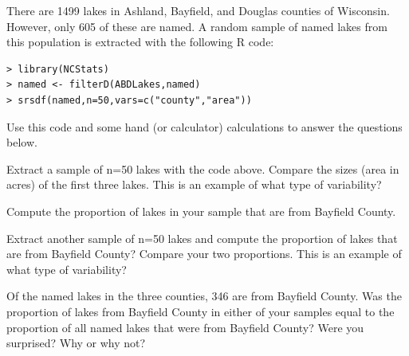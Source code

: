 \documentclass[10pt,openany]{book}\usepackage[]{graphicx}\usepackage[]{color}
\makeatletter
\newenvironment{kframe}{%
 \def\at@end@of@kframe{}%
 \ifinner\ifhmode%
  \def\at@end@of@kframe{\end{minipage}}%
  \begin{minipage}{\columnwidth}%
 \fi\fi%
 \def\FrameCommand##1{\hskip\@totalleftmargin \hskip-\fboxsep
 \colorbox{shadecolor}{##1}\hskip-\fboxsep
     \hskip-\linewidth \hskip-\@totalleftmargin \hskip\columnwidth}%
 \MakeFramed {\advance\hsize-\width
   \@totalleftmargin\z@ \linewidth\hsize
   \@setminipage}}%
 {\par\unskip\endMakeFramed%
 \at@end@of@kframe}
\newenvironment{knitrout}{}{} %
\makeatother
\begin{document}
\newpage
\begin{exsection}
  \item \label{revex:WhyStatsLakes} There are 1499 lakes in Ashland, Bayfield, and Douglas counties of Wisconsin.  However, only 605 of these are named.  A random sample of named lakes from this population is extracted with the following R code:
\vspace{-12pt}
\begin{knitrout}
\color{fgcolor}\begin{kframe}
\begin{verbatim}
> library(NCStats)
> named <- filterD(ABDLakes,named)
> srsdf(named,n=50,vars=c("county","area"))
\end{verbatim}
\end{kframe}
\end{knitrout}
Use this code and some hand (or calculator) calculations to answer the questions below. 
    \begin{Enumerate}
      \item Extract a sample of n=50 lakes with the code above.  Compare the sizes (area in acres) of the first three lakes.  This is an example of what type of variability?
      \item Compute the proportion of lakes in your sample that are from Bayfield County.
      \item Extract another sample of n=50 lakes and compute the proportion of lakes that are from Bayfield County? Compare your two proportions. This is an example of what type of variability?
      \item Of the named lakes in the three counties, 346 are from Bayfield County.  Was the proportion of lakes from Bayfield County in either of your samples equal to the proportion of all named lakes that were from Bayfield County?  Were you surprised?  Why or why not?
    \end{Enumerate}
\end{exsection}
\end{document}
